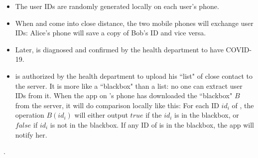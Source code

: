       \begin{itemize}
          \item The user IDs are randomly generated locally on each user's phone.
          \item When  and  come into close distance, the two mobile phones will exchange user IDs: Alice's phone will save a copy of Bob's ID and vice versa.
          \item Later,  is diagnosed and confirmed by the health department to have COVID-19.
          \item {} is authorized by the health department to upload his ``list" of close contact to the server. It is more like a ``blackbox" than a list: no one can extract user IDs from it. When the app on 's phone has downloaded the ``blackbox" $B$ from the server, it will do comparison locally like this: For each ID $id_{i}$ of , the operation $B(id_i)$ will either output $true$ if the $id_i$ is in the blackbox, or $false$ if $id_i$ is not in the blackbox. If any ID of  is in the blackbox, the app will notify her.
      \end{itemize}
      \par {}.
